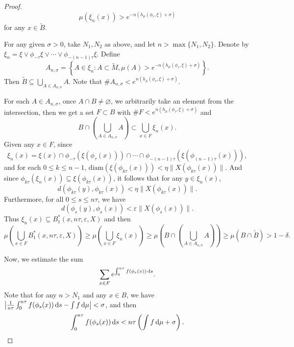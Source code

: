 \documentclass[10pt]{article}
\newtheorem*{Theorem A}{Theorem A}
\begin{document}
\begin{proof}
\noindent
{}
\[
\mu(\xi_n(x)) > e^{-n(h_\mu(\phi_\tau, \xi) + \sigma)}
\]
for any $x\in\tilde{B}$.

For any given \( \sigma > 0 \), take \( N_1, N_2 \) as above, and let \( n > \max\{N_1, N_2\} \). Denote by $\xi_n=\xi\vee\phi_{-\tau}\xi\vee\cdots\vee\phi_{-(n-1)\tau}\xi$. Define
\[
A_{n,\sigma} = \left\{ A \in \xi_n : A\subset \tilde{M}, \mu(A) > e^{-n(h_\mu(\phi_\tau, \xi) + \sigma)} \right\}.
\]
Then \( \tilde{B} \subseteq \bigcup\limits_{A \in A_{n,\sigma}} A \). Note that \( \# A_{n,\sigma} < e^{n(h_\mu(\phi_\tau, \xi) + \sigma)} \).

For each \( A \in A_{n,\sigma} \), once \( A \cap {B} \neq \varnothing \),  we arbitrarily take an element from the intersection, then we get a set \( F\subset B \) with \( \#F < e^{n(h_\mu(\phi_\tau, \xi) + \sigma)} \)
and \[ B \cap \left( \bigcup\limits_{A \in A_{n,\sigma}} A \right) \subset \bigcup\limits_{x \in F} \xi_n(x). \]
Given any \( x \in F \), since
\[
\xi_n(x) = \xi(x) \cap \phi_{-\tau}(\xi(\phi_\tau(x))) \cap \cdots \cap \phi_{-(n-1)\tau}(\xi(\phi_{(n-1)\tau}(x))),
\]
and for each \( 0 \leq k \leq n-1 \), \( \text{diam}(\xi(\phi_{k\tau}(x))) < \eta \| X(\phi_{k\tau}(x)) \| \). And since \( \phi_{k\tau}(\xi_n(x)) \subseteq \xi(\phi_{k\tau}(x)) \), it follows that for any \( y \in \xi_n(x) \),
\[
d(\phi_{k\tau}(y), \phi_{k\tau}(x)) < \eta \| X(\phi_{k\tau}(x)) \|.
\] Furthermore, for all \( 0 \leq s \leq n\tau \), we have
\[
 d(\phi_s(y), \phi_s(x)) < \varepsilon \| X(\phi_{s}(x)) \| .
\]
Thus \( \xi_n(x) \subseteq B_1^*(x, n\tau, \varepsilon, X) \) and then
\[
 \mu\left( \bigcup\limits_{x \in F} B_1^*(x, n\tau, \varepsilon, X) \right) \geq \mu\left( \bigcup\limits_{x \in F} \xi_n(x) \right) \geq \mu\left( B \cap \left( \bigcup\limits_{A \in A_{n,\sigma}} A \right) \right) \geq\mu\left(B\cap\tilde{B}\right)> 1 - \delta.
 \]

Now, we estimate the sum
\[
\sum_{x \in F} e^{\int_{0}^{n \tau} f(\phi_s(x)) \, {\rm d}s}.
\]
Note that for any \( n > N_1 \) and any \(  x \in B \), we have
\( \left| \frac{1}{n\tau} \int_{0}^{n\tau} f(\phi_s(x)) \, {\rm d}s - \int f \, {\rm d}\mu \right| < \sigma \), and  then
\[ \int_{0}^{n\tau} f(\phi_s(x)) \, {\rm d}s < n\tau \left( \int f \, {\rm d}\mu + \sigma \right). \]


\end{proof}
\end{document}

